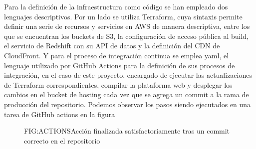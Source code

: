 
Para la definición de la infraestructura como código se han empleado dos lenguajes descriptivos. Por un lado se utiliza Terraform, cuya sintaxis permite definir una serie de recursos y servicios en AWS de manera descriptiva, entre los que se encuentran los buckets de S3, la configuración de acceso pública al build, el servicio de Redshift con su API de datos y la definición del CDN de CloudFront. Y para el proceso de integración continua se emplea yaml, el lenguaje utilizado por GitHub Actions para la definición de sus procesos de integración, en el caso de este proyecto, encargado de ejecutar las actualizaciones de Terraform correspondientes, compilar la plataforma web y desplegar los cambios en el bucket de hosting cada vez que se agrega un commit a la rama de producción del repositorio. Podemos observar los pasos siendo ejecutados en una tarea de GitHub actions en la figura 

\begin{figure}[Ejemplo de tarea ejecutada por GitHub Actions]{FIG:ACTIONS}{Acción finalizada satisfactoriamente tras un commit correcto en el repositorio}
\end{figure}
